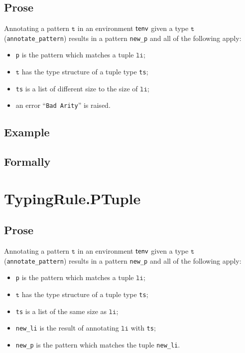 \documentclass{book}
\newcommand\vt[0]{\texttt{t}}
\newcommand\vli[0]{\texttt{li}}
\begin{document}
  \subsection{Prose}
   Annotating a pattern $\vt$ in an environment $\textsf{tenv}$ given a type $\vt$ (\texttt{annotate\_pattern}) results in a pattern \texttt{new\_p} and all of the following apply:
   \begin{itemize}
   \item \texttt{p} is the pattern which matches a tuple $\vli$;
   \item $\vt$ has the type structure of a tuple type \texttt{ts};
   \item \texttt{ts} is a list of different size to the size of $\vli$;
   \item an error ``\texttt{Bad Arity}'' is raised.
   \end{itemize}

  \subsection{Example}



\begin{emptyformal}
    \subsection{Formally}
\end{emptyformal}



\section{TypingRule.PTuple \label{sec:TypingRule.PTuple}}

  \subsection{Prose}
   Annotating a pattern $\vt$ in an environment $\textsf{tenv}$ given a type $\vt$ (\texttt{annotate\_pattern}) results in a pattern \texttt{new\_p} and all of the following apply:
   \begin{itemize}
   \item \texttt{p} is the pattern which matches a tuple $\vli$;
   \item $\vt$ has the type structure of a tuple type \texttt{ts};
   \item \texttt{ts} is a list of the same size as $\vli$;
   \item \texttt{new\_li} is the result of annotating $\vli$ with \texttt{ts};
   \item \texttt{new\_p} is the pattern which matches the tuple \texttt{new\_li}.
   \end{itemize}
\end{document}
